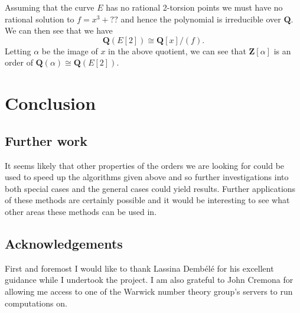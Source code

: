 \documentclass[a4paper,abstracton,bibtotoc]{scrreprt}
\theoremstyle{definition}
\newcommand{\QQ}{\mathbf{Q}}
\newcommand{\ZZ}{\mathbf{Z}}
\begin{document}
\minisec{}
Assuming that the curve $E$ has no rational 2-torsion points we must have no rational solution to $f = x^3 + ??$ and hence the polynomial is irreducible over $\QQ$.
We can then see that we have
\[
\QQ(E[2]) \cong \QQ[x]/(f).
\]
Letting $\alpha$ be the image of $x$ in the above quotient, we can see that $ \ZZ[\alpha]$ is an order of $\QQ(\alpha)\cong \QQ(E[2])$.


\chapter{Conclusion}

\section{Further work}
It seems likely that other properties of the orders we are looking for could be used to speed up the algorithms given above and so further investigations into both special cases and the general cases could yield results.
Further applications of these methods are certainly possible and it would be interesting to see what other areas these methods can be used in.

\section{Acknowledgements}
First and foremost I would like to thank Lassina Demb\'el\'e for his excellent guidance while I undertook the project.
I am also grateful to John Cremona for allowing me access to one of the Warwick number theory group's servers to run computations on.


 
%

%

\nocite{*}


\end{document}
